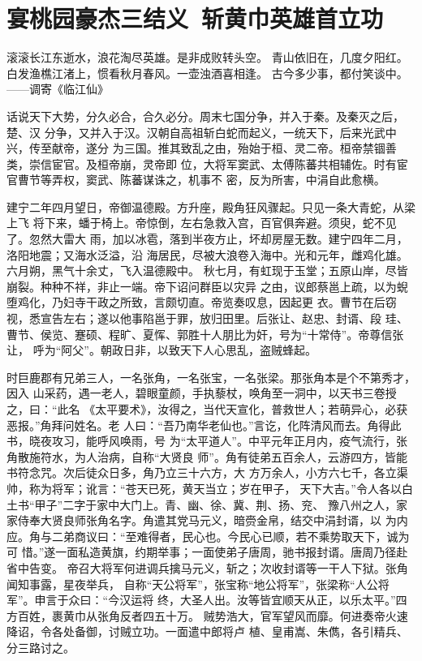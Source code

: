 \chapter{宴桃园豪杰三结义~斩黄巾英雄首立功}

滚滚长江东逝水，浪花淘尽英雄。是非成败转头空。
青山依旧在，几度夕阳红。
白发渔樵江渚上，惯看秋月春风。一壶浊酒喜相逢。
古今多少事，都付笑谈中。
——调寄《临江仙》

话说天下大势，分久必合，合久必分。周末七国分争，并入于秦。及秦灭之后，楚、汉
分争，又并入于汉。汉朝自高祖斩白蛇而起义，一统天下，后来光武中兴，传至献帝，遂分
为三国。推其致乱之由，殆始于桓、灵二帝。桓帝禁锢善类，崇信宦官。及桓帝崩，灵帝即
位，大将军窦武、太傅陈蕃共相辅佐。时有宦官曹节等弄权，窦武、陈蕃谋诛之，机事不
密，反为所害，中涓自此愈横。

建宁二年四月望日，帝御温德殿。方升座，殿角狂风骤起。只见一条大青蛇，从梁上飞
将下来，蟠于椅上。帝惊倒，左右急救入宫，百官俱奔避。须臾，蛇不见了。忽然大雷大
雨，加以冰雹，落到半夜方止，坏却房屋无数。建宁四年二月，洛阳地震；又海水泛溢，沿
海居民，尽被大浪卷入海中。光和元年，雌鸡化雄。六月朔，黑气十余丈，飞入温德殿中。
秋七月，有虹现于玉堂；五原山岸，尽皆崩裂。种种不祥，非止一端。帝下诏问群臣以灾异
之由，议郎蔡邕上疏，以为蜺堕鸡化，乃妇寺干政之所致，言颇切直。帝览奏叹息，因起更
衣。曹节在后窃视，悉宣告左右；遂以他事陷邕于罪，放归田里。后张让、赵忠、封谞、段
珪、曹节、侯览、蹇硕、程旷、夏恽、郭胜十人朋比为奸，号为“十常侍”。帝尊信张让，
呼为“阿父”。朝政日非，以致天下人心思乱，盗贼蜂起。

时巨鹿郡有兄弟三人，一名张角，一名张宝，一名张梁。那张角本是个不第秀才，因入
山采药，遇一老人，碧眼童颜，手执藜杖，唤角至一洞中，以天书三卷授之，曰：“此名
《太平要术》，汝得之，当代天宣化，普救世人；若萌异心，必获恶报。”角拜问姓名。老
人曰：“吾乃南华老仙也。”言讫，化阵清风而去。角得此书，晓夜攻习，能呼风唤雨，号
为“太平道人”。中平元年正月内，疫气流行，张角散施符水，为人治病，自称“大贤良
师”。角有徒弟五百余人，云游四方，皆能书符念咒。次后徒众日多，角乃立三十六方，大
方万余人，小方六七千，各立渠帅，称为将军；讹言：“苍天已死，黄天当立；岁在甲子，
天下大吉。”令人各以白土书“甲子”二字于家中大门上。青、幽、徐、冀、荆、扬、兖、
豫八州之人，家家侍奉大贤良师张角名字。角遣其党马元义，暗赍金帛，结交中涓封谞，以
为内应。角与二弟商议曰：“至难得者，民心也。今民心已顺，若不乘势取天下，诚为可
惜。”遂一面私造黄旗，约期举事；一面使弟子唐周，驰书报封谞。唐周乃径赴省中告变。
帝召大将军何进调兵擒马元义，斩之；次收封谞等一干人下狱。张角闻知事露，星夜举兵，
自称“天公将军”，张宝称“地公将军”，张梁称“人公将军”。申言于众曰：“今汉运将
终，大圣人出。汝等皆宜顺天从正，以乐太平。”四方百姓，裹黄巾从张角反者四五十万。
贼势浩大，官军望风而靡。何进奏帝火速降诏，令各处备御，讨贼立功。一面遣中郎将卢
植、皇甫嵩、朱儁，各引精兵、分三路讨之。

